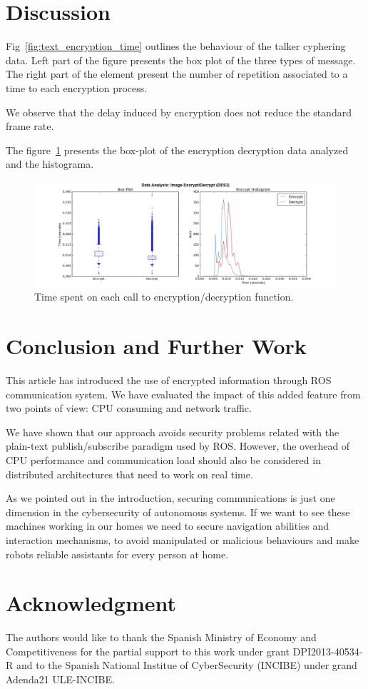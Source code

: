 \documentclass[journal,twoside]{JoPhA}
\begin{document}
\section{Discussion}

Fig~\ref{fig:text_encryption_time} outlines the behaviour of the talker cyphering data. Left part of the figure presents the box plot of the three types of message. The right part of the element present the number of repetition associated to a time to each encryption process.


We observe that the delay induced by encryption does not reduce the standard frame rate. 

The figure~\ref{fig:images_encryption} presents the box-plot of the encryption decryption data analyzed and the histograma. 

\begin{figure}[ht]
    \centering
    \includegraphics[width=.9\textwidth]{Outline_images_encryption_decrytiontime2.png}
    \caption{Time spent on each call to encryption/decryption function.}
  \label{fig:images_encryption}
\end{figure}

\section{Conclusion and Further Work}

This article has introduced the use of encrypted information through ROS communication system.
We have evaluated the impact of this added feature from two points of view: CPU consuming and network traffic. 

We have shown that our approach avoids security problems related with the plain-text publish/subscribe paradigm used by ROS. However, the overhead of CPU performance and communication load should also be considered in distributed architectures that need to work on real time.

As we pointed out in the introduction, securing communications is just one dimension in the cybersecurity of autonomous systems. If we want to see these machines working in our homes we need to secure navigation abilities and interaction mechanisms, to avoid manipulated or malicious behaviours and make robots reliable assistants for every person at home.


\section*{Acknowledgment}
The authors would like to thank the Spanish Ministry of Economy and Competitiveness for the partial support to this work under grant DPI2013-40534-R and to the Spanish National Institue of CyberSecurity (INCIBE) under grand Adenda21 ULE-INCIBE.

 

\end{document}
